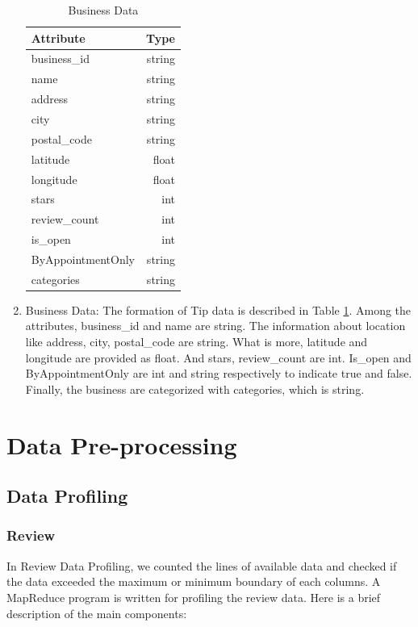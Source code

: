 \documentclass{stylefiles/capstone}
\begin{document}
\begin{enumerate}
    \begin{table}[h!]
        \centering
        \begin{tabular}{l r } 
         \hline
         Attribute &  Type \\ [0.5ex] 
         \hline
        business\_id & string\\
        name & string\\
        address & string\\
        city & string\\
        postal\_code & string\\
        latitude & float\\
        longitude & float\\
        stars & int\\
        review\_count & int\\
        is\_open & int\\
        ByAppointmentOnly & string\\
        categories & string\\
         [1ex] 
         \hline
        \end{tabular}
        \caption{Business Data}
    \label{BusinessData}
    \end{table}
    \item Business Data: The formation of Tip data is described in Table \ref{BusinessData}. Among the attributes, business\_id and name are string. The information about location like address, city, postal\_code are string. What is more, latitude and longitude are provided as float. And stars, review\_count are int. Is\_open and ByAppointmentOnly are int and string respectively to indicate true and false. Finally, the business are categorized with categories, which is string.
\end{enumerate}


\section{Data Pre-processing}
\subsection{Data Profiling}
\subsubsection{\textbf{Review}}

In Review Data Profiling, we counted the lines of available data and checked if the data exceeded the maximum or minimum boundary of each columns. A MapReduce program is written for profiling the review data. Here is a brief description of the main components:
\end{document}

